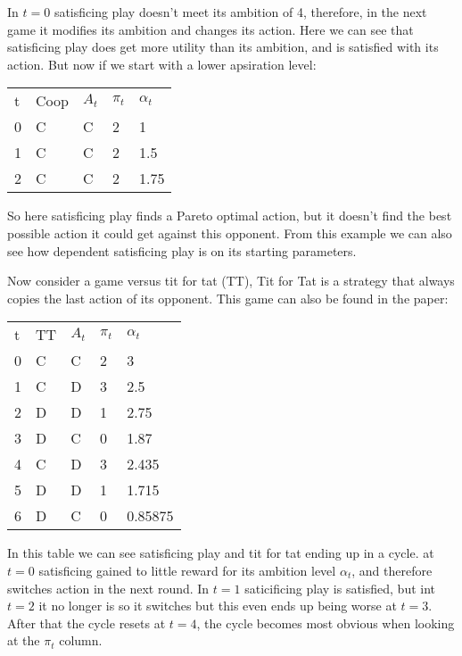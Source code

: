 \drafting In $t=0$ satisficing play doesn't meet its ambition of 4, therefore, in the
next game it modifies its ambition and changes its action. Here we can see
that satisficing play does get more utility than its ambition, and is satisfied
with its action.
But now if we start with a lower apsiration level:

\begin{tabular}{lllll}
  t & Coop & $A_t$ & $\pi_t$ & $\alpha_t$ \\
  0 & C     & C    & 2       & 1 \\
  1 & C     & C    & 2       & 1.5 \\
  2 & C     & C    & 2       & 1.75 \\
\end{tabular}

\drafting So here satisficing play finds a Pareto optimal action, but it doesn't find
the best possible action it could get against this opponent. From this example
we can also see how dependent satisficing play is on its starting parameters.

\drafting Now consider a game versus tit for tat (TT), Tit for Tat is a
strategy that always copies the last action of its opponent.
This game can also be found in the \citep{stimpson:2001} paper:

\begin{tabular}{lllll}
        t & TT & $A_t$ & $\pi_t$ & $\alpha_t$ \\
        0 & C     & C    & 2       & 3  \\
        1 & C     & D    & 3       & 2.5 \\
        2 & D     & D    & 1       & 2.75 \\
        3 & D     & C    & 0       & 1.87 \\
        4 & C     & D    & 3       & 2.435 \\
        5 & D     & D    & 1       & 1.715 \\
        6 & D     & C    & 0       & 0.85875 \\
\end{tabular}

In this table we can see satisficing play and tit for tat ending up in a cycle.
at $t=0$ satisficing gained to little reward for its ambition level $\alpha_t$,
and therefore switches action in the next round. In $t=1$ saticificing play
is satisfied, but int $t=2$ it no longer is so it switches but this even ends
up being worse at $t=3$. After that the cycle resets at $t=4$, the cycle becomes
most obvious when looking at the $\pi_t$ column.
